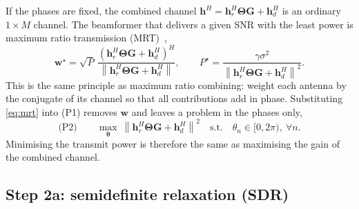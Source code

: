 \documentclass[11pt,a4paper]{article}
\newcommand{\hrv}{\bm{h}_r}
\newcommand{\hdv}{\bm{h}_d}
\newcommand{\Gm}{\bm{G}}
\newcommand{\wv}{\bm{w}}
\newcommand{\Thm}{\bm{\Theta}}
\begin{document}
If the phases are fixed, the combined channel $\bm{h}^H = \hrv^H\Thm\Gm+\hdv^H$ is an ordinary
$1\times M$ channel. The beamformer that delivers a given SNR with the least power is maximum ratio
transmission (MRT)~\cite{tse,goldsmith},
\begin{equation}
\wv^\star = \sqrt{P}\,\frac{\left(\hrv^H\Thm\Gm+\hdv^H\right)^H}{\left\|\hrv^H\Thm\Gm+\hdv^H\right\|},
\qquad
P^\star = \frac{\gamma\sigma^2}{\left\|\hrv^H\Thm\Gm+\hdv^H\right\|^2}.
\label{eq:mrt}
\end{equation}
This is the same principle as maximum ratio combining: weight each antenna by the conjugate of its
channel so that all contributions add in phase. Substituting \eqref{eq:mrt} into (P1) removes $\wv$
and leaves a problem in the phases only,
\begin{equation}
\text{(P2)}\qquad \max_{\bm{\theta}}\ \left\|\hrv^H\Thm\Gm+\hdv^H\right\|^2
\quad\text{s.t.}\quad \theta_n\in[0,2\pi),\ \forall n.
\label{eq:p2}
\end{equation}
Minimising the transmit power is therefore the same as maximising the gain of the combined channel.

\subsection{Step 2a: semidefinite relaxation (SDR)}
\end{document}
